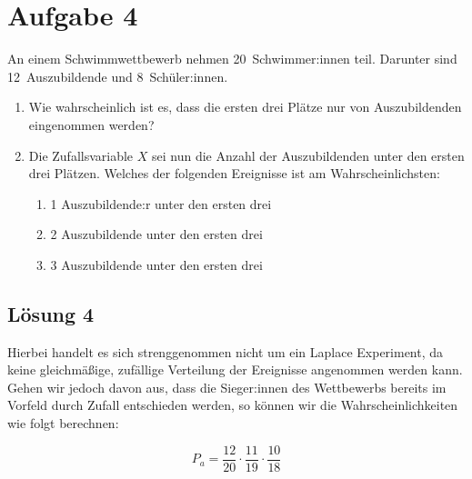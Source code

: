 \documentclass[main.tex]{subfiles}
\begin{document}
\section{Aufgabe 4}
An einem Schwimmwettbewerb nehmen 20~Schwimmer:innen teil. Darunter sind 12~Auszubildende und 8~Schüler:innen.
\begin{enumerate}
    \item Wie wahrscheinlich ist es, dass die ersten drei Plätze nur von Auszubildenden eingenommen werden?
    \item Die Zufallsvariable $X$ sei nun die \glqq Anzahl der Auszubildenden unter den ersten drei Plätzen\grqq. Welches der folgenden Ereignisse ist am Wahrscheinlichsten:
    \begin{enumerate}
        \item  1 Auszubildende:r unter den ersten drei
        \item 2 Auszubildende unter den ersten drei
        \item 3 Auszubildende unter den ersten drei
    \end{enumerate}
\end{enumerate}

\subsection{Lösung 4}
Hierbei handelt es sich strenggenommen nicht um ein Laplace Experiment, da  keine gleichmäßige, zufällige Verteilung der Ereignisse angenommen werden kann. Gehen wir jedoch davon aus, dass die Sieger:innen des Wettbewerbs bereits im Vorfeld durch Zufall entschieden werden, so können wir die Wahrscheinlichkeiten wie folgt berechnen:

\begin{equation*}
    P_a = \frac{12}{20} \cdot \frac{11}{19} \cdot \frac{10}{18} 
\end{equation*}
\end{document}
